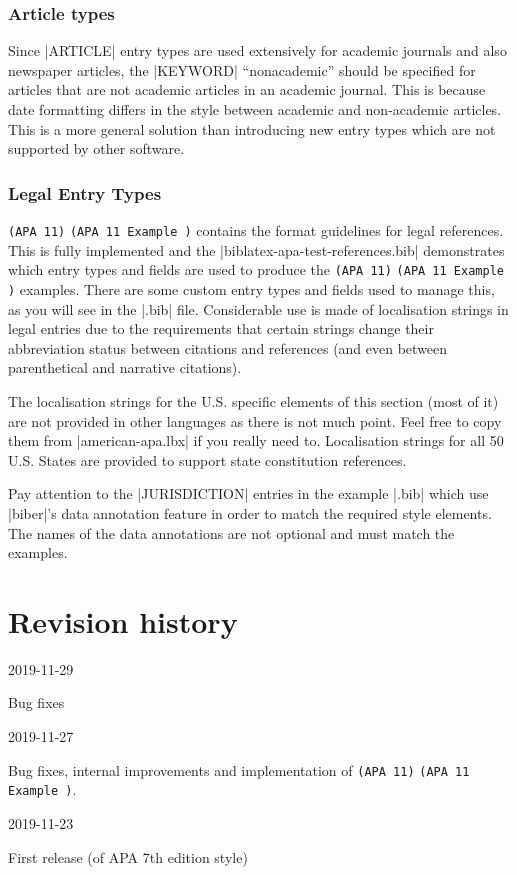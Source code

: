 \documentclass{ltxdockit}
\newcommand\apa[2][]{\ifthenelse{\equal{#1}{}}%
                       {\texttt{(APA #2)}}%
                       {\texttt{(APA #2 Example #1)}}}
\begin{document}
\subsubsection{Article types}

Since |ARTICLE| entry types are used extensively for academic journals and
also newspaper articles, the |KEYWORD| ``nonacademic'' should be specified
for articles that are not academic articles in an academic journal. This is
because date formatting differs in the style between academic and
non-academic articles. This is a more general solution than introducing new
entry types which are not supported by other software.

\subsubsection{Legal Entry Types}

\apa{11} contains the format guidelines for legal references. This is fully
implemented and the |biblatex-apa-test-references.bib| demonstrates which
entry types and fields are used to produce the \apa{11} examples. There are
some custom entry types and fields used to manage this, as you will see in
the |.bib| file. Considerable use is made of localisation strings in legal
entries due to the requirements that certain strings change their
abbreviation status between citations and references (and even between
parenthetical and narrative citations).

The localisation strings for the U.S. specific elements of this section
(most of it) are not provided in other languages as there is not much
point. Feel free to copy them from |american-apa.lbx| if you really need
to. Localisation strings for all 50 U.S. States are provided to support
state constitution references.

Pay attention to the |JURISDICTION| entries in the example |.bib| which use
|biber|'s data annotation feature in order to match the required style
elements. The names of the data annotations are not optional and must match
the examples.

\section{Revision history}\label{rev}

\begin{changelog}

\begin{release}{9.2}{2019-11-29}
\item Bug fixes
\end{release}
  
\begin{release}{9.1}{2019-11-27}
\item Bug fixes, internal improvements and implementation of \apa{11}.
\end{release}

\begin{release}{9.0}{2019-11-23}
\item First release (of APA 7th edition style)
\end{release}

\end{changelog}
\end{document}

